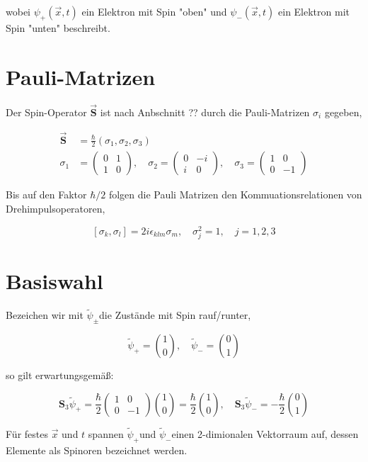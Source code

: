 \documentclass[10pt, letterpaper]{article}
\begin{document}
wobei $\psi_{+}(\vec{x}, t)$ ein Elektron mit Spin "oben" und $\psi_{-}(\vec{x}, t)$ ein Elektron mit Spin "unten" beschreibt.

\section*{Pauli-Matrizen}
Der Spin-Operator $\overrightarrow{\mathbf{S}}$ ist nach Anbschnitt ?? durch die Pauli-Matrizen $\sigma_{i}$ gegeben,

$$
\begin{aligned}
\overrightarrow{\mathbf{S}} & =\frac{\hbar}{2}\left(\sigma_{1}, \sigma_{2}, \sigma_{3}\right) \\
\sigma_{1} & =\left(\begin{array}{cc}
0 & 1 \\
1 & 0
\end{array}\right), \quad \sigma_{2}=\left(\begin{array}{cc}
0 & -i \\
i & 0
\end{array}\right), \quad \sigma_{3}=\left(\begin{array}{cc}
1 & 0 \\
0 & -1
\end{array}\right)
\end{aligned}
$$

Bis auf den Faktor $\hbar / 2$ folgen die Pauli Matrizen den Kommuationsrelationen von Drehimpulsoperatoren,

$$
\left[\sigma_{k}, \sigma_{l}\right]=2 i \epsilon_{k l m} \sigma_{m}, \quad \sigma_{j}^{2}=1, \quad j=1,2,3
$$

\section*{Basiswahl}
Bezeichen wir mit $\tilde{\psi}_{ \pm}$die Zustände mit Spin rauf/runter,

$$
\tilde{\psi}_{+}=\binom{1}{0}, \quad \tilde{\psi}_{-}=\binom{0}{1}
$$

so gilt erwartungsgemäß:

$$
\mathbf{S}_{3} \tilde{\psi}_{+}=\frac{\hbar}{2}\left(\begin{array}{cc}
1 & 0 \\
0 & -1
\end{array}\right)\binom{1}{0}=\frac{\hbar}{2}\binom{1}{0}, \quad \mathbf{S}_{3} \tilde{\psi}_{-}=-\frac{\hbar}{2}\binom{0}{1}
$$

Für festes $\vec{x}$ und $t$ spannen $\tilde{\psi}_{+}$und $\tilde{\psi}_{-}$einen 2-dimionalen Vektorraum auf, dessen Elemente als Spinoren bezeichnet werden.
\end{document}
